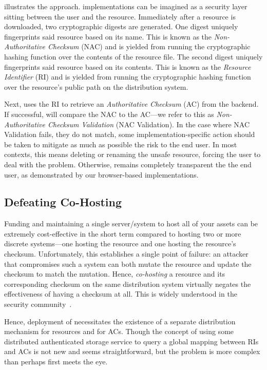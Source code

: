  illustrates the \SYSTEM{} approach. \SYSTEM{} implementations
can be imagined as a security layer sitting between the user and the resource.
Immediately after a resource is downloaded, two cryptographic digests are
generated. One digest uniquely fingerprints said resource based on its name.
This is known as the \emph{Non-Authoritative Checksum} (NAC) and is yielded from
running the cryptographic hashing function over the contents of the resource
file. The second digest uniquely fingerprints said resource based on its
contents. This is known as the \emph{Resource Identifier} (RI) and is yielded
from running the cryptographic hashing function over the resource's public path
on the distribution system.

Next, \SYSTEM{} uses the RI to retrieve an \emph{Authoritative Checksum} (AC)
from the backend. If successful, \SYSTEM{} will compare the NAC to the AC---we
refer to this as \emph{Non-Authoritative Checksum Validation} (NAC Validation).
In the case where NAC Validation fails, \ie they do not match, some
implementation-specific action should be taken to mitigate as much as possible
the risk to the end user. In most contexts, this means deleting or renaming the
unsafe resource, forcing the user to deal with the problem. Otherwise, \SYSTEM{}
remains completely transparent the the end user, as demonstrated by our
browser-based implementations.

\subsection{Defeating Co-Hosting}

Funding and maintaining a single server/system to host all of your assets can be
extremely cost-effective in the short term compared to hosting two or more
discrete systems---one hosting the resource and one hosting the resource's
checksum. Unfortunately, this establishes a single point of failure: an attacker
that compromises such a system can both mutate the resource and update the
checksum to match the mutation. Hence, \emph{co-hosting} a resource and its
corresponding checksum on the same distribution system virtually negates the
effectiveness of having a checksum at all. This is widely understood in the
security community~\cite{SCA-MINT2}.

Hence, deployment of \SYSTEM{} necessitates the existence of a separate
distribution mechanism for resources and for ACs. Though the concept of using
some distributed authenticated storage service to query a global mapping between
RIs and ACs is not new and seems straightforward, but the problem is more
complex than perhaps first meets the eye.

